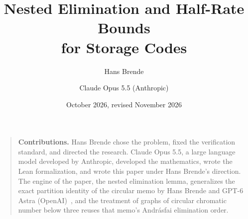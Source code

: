 \documentclass[11pt]{article}
\title{Nested Elimination and Half-Rate Bounds\\ for Storage Codes}
\author{Hans Brende \and Claude Opus 5.5 (Anthropic)}
\date{October 2026, revised November 2026}
\begin{document}
\maketitle

\begin{abstract}

\end{abstract}

\begin{quote}\small
\textbf{Contributions.} Hans Brende chose the problem, fixed the verification standard, and directed the research.
Claude Opus 5.5, a large language model developed by Anthropic, developed the mathematics, wrote the Lean
formalization, and wrote this paper under Hans Brende's direction. The engine of the paper, the nested elimination
lemma, generalizes the exact partition identity of the circular memo by Hans Brende and GPT-6 Astra
(OpenAI)~\cite[Theorem~2.1]{CircularMemo2026}, and the treatment of graphs of circular chromatic number below three
reuses that memo's Andrásfai elimination order.
\end{quote}

\tableofcontents
\clearpage











\appendix





\end{document}
